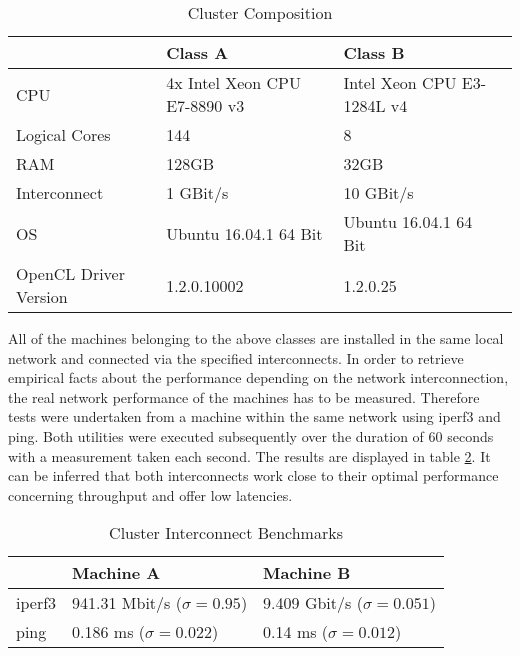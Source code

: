 \begin{table}[htb]
	\centering
	\begin{adjustbox}{width=1\textwidth}
		\small
		\begin{tabular}{l | l | l | l}
			~                     & Class A                  	& Class B                  \\
			\hline
			CPU                   &  4x Intel Xeon CPU E7-8890 v3 	& Intel Xeon CPU E3-1284L v4 \\
			Logical Cores         &  144 	& 8 \\
			RAM                   &  128GB                       	& 32GB                       \\
			Interconnect          &  1 GBit/s                  	& 10 GBit/s                  \\
			OS                    &  Ubuntu 16.04.1 64 Bit      	& Ubuntu 16.04.1 64 Bit      \\
			OpenCL Driver Version &  1.2.0.10002                   & 1.2.0.25                   \\
		\end{tabular}
	\end{adjustbox}
	
	\caption{Cluster Composition}
	\label{table:cluster_setup_1}
\end{table}

All of the machines belonging to the above classes are installed in the same local network and connected via the specified interconnects. In order to retrieve empirical facts about the performance depending on the network interconnection, the real network performance of the machines has to be measured. Therefore tests were undertaken from a machine within the same network using iperf3 and ping. Both utilities were executed subsequently over the duration of 60 seconds with a measurement taken each second. The results are displayed in table \ref{table:cluster_interconnect_benchmarks}. It can be inferred that both interconnects work close to their optimal performance concerning throughput and offer low latencies.

\begin{table}[!htb]
	\centering
	\begin{adjustbox}{width=0.5\textwidth}
		\small
		\begin{tabular}{l | l | l}
			~                     & Machine A                 			& Machine B                  \\
			\hline
			iperf3                & 941.31 Mbit/s ($\sigma = 0.95$) 	& 9.409 Gbit/s ($\sigma = 0.051$) \\
			ping                  & 0.186 ms ($\sigma = 0.022$)  		& 0.14 ms ($\sigma = 0.012$)  \\
		\end{tabular}
	\end{adjustbox}
	
	\caption{Cluster Interconnect Benchmarks}
	\label{table:cluster_interconnect_benchmarks}
\end{table}

